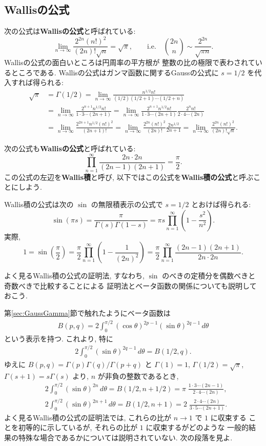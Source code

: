 \documentclass[12pt,twoside]{jarticle}
\theoremstyle{jplain}
\theoremstyle{jplain}
\theoremstyle{jplain}
\numberwithin{theorem}{section}
\numberwithin{equation}{section}
\numberwithin{figure}{section}
\numberwithin{table}{section}
\newcommand\secref[1]{第\ref{#1}節}
\begin{document}
\subsection{Wallisの公式}
\label{sec:Wallis}

次の公式は{\bfseries Wallisの公式}と呼ばれている:
\[
\lim_{n\to\infty}\frac{2^{2n}(n!)^2}{(2n)!\sqrt{n}}
=\sqrt{\pi},
\qquad
\text{i.e.}\quad
\binom{2n}{n}\sim\frac{2^{2n}}{\sqrt{\pi n}}.
\]
Wallisの公式の面白いところは円周率の平方根が
整数の比の極限で表わされているところである.
Wallisの公式はガンマ函数に関するGaussの公式に $s=1/2$ を代入すれば得られる:
\begin{align*}
\sqrt{\pi}&
=\Gamma(1/2)
=\lim_{n\to\infty}\frac{n^{1/2} n!}{(1/2)(1/2+1)\cdots(1/2+n)}
\\ &
=\lim_{n\to\infty}
\frac{2^{n+1}n^{1/2}n!}{1\cdot3\cdots(2n+1)}
=\lim_{n\to\infty}
\frac{2^{n+1}n^{1/2}n!}{1\cdot3\cdots(2n+1)}\frac{2^n n!}{2\cdot4\cdots(2n)}
\\ &
=\lim_{n\to\infty}
\frac{2^{2n+1}n^{1/2}(n!)^2}{(2n+1)!}
=\lim_{n\to\infty}
\frac{2^{2n}(n!)^2}{(2n)!}\frac{2n^{1/2}}{2n+1}
=\lim_{n\to\infty}
\frac{2^{2n}(n!)^2}{(2n)!\sqrt{n}}.
\end{align*}

次の公式も{\bfseries Wallisの公式}と呼ばれている:
\[
\prod_{n=1}^\infty\frac{2n\cdot 2n}{(2n-1)(2n+1)} = \frac{\pi}{2}.
\]
この公式の左辺を{\bfseries Wallis積}と呼び,
以下ではこの公式を{\bfseries Wallis積の公式}と呼ぶことにしよう.

Wallis積の公式は次の $\sin$ の無限積表示の公式で $s=1/2$ とおけば得られる:
\[
\sin(\pi s)
= \frac{\pi}{\Gamma(s)\Gamma(1-s)}
= \pi s\prod_{n=1}^\infty\left(1-\frac{s^2}{n^2}\right).
\]
実際,
\[
1=\sin\left(\frac{\pi}{2}\right)
=\frac{\pi}{2}\prod_{n=1}^\infty\left(1-\frac{1}{(2n)^2}\right)
=\frac{\pi}{2}\prod_{n=1}^\infty\frac{(2n-1)(2n+1)}{2n\cdot 2n}.
\]

よく見るWallis積の公式の証明法,
すなわち, $\sin$ のべきの定積分を偶数べきと奇数べきで比較することによる
証明法とベータ函数の関係についても説明しておこう.

\secref{sec:GaussGamma}で触れたようにベータ函数は
\begin{align*}
  B(p,q) = 2\int_0^{\pi/2} (\cos\theta)^{2p-1} (\sin\theta)^{2q-1}\,d\theta
\end{align*}
という表示を持つ. これより, 特に
\begin{align*}
  2 \int_0^{\pi/2} (\sin\theta)^{2q-1}\,d\theta = B(1/2,q).
\end{align*}
ゆえに $B(p,q)=\Gamma(p)\Gamma(q)/\Gamma(p+q)$
と $\Gamma(1)=1$, $\Gamma(1/2)=\sqrt{\pi}$, $\Gamma(s+1)=s\Gamma(s)$ より,
$n$ が非負の整数であるとき,
\begin{align*}
  &
  2 \int_0^{\pi/2} (\sin\theta)^{2n}\,d\theta = B(1/2,n+1/2)
  = \pi\;\frac{1\cdot3\cdots(2n-1)}{2\cdot 4\cdots(2n)},
  \\ &
  2 \int_0^{\pi/2} (\sin\theta)^{2n+1}\,d\theta = B(1/2,n+1)
  = 2\;\frac{2\cdot 4\cdots(2n)}{3\cdot5\cdots(2n+1)}.
\end{align*}
よく見るWallis積の公式の証明法では, これらの比が $n\to 1$ で $1$ に収束する
ことを初等的に示しているが, それらの比が $1$ に収束するがどのような
一般的結果の特殊な場合であるかについては説明されていない.
次の段落を見よ.
\end{document}
